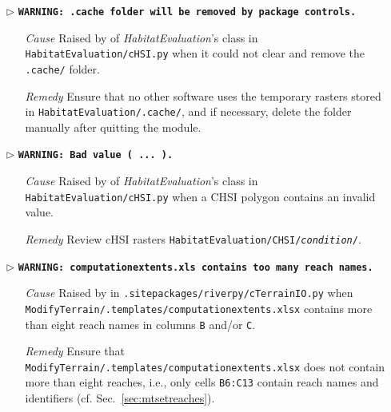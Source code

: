 \begin{itemize}
	\item[$\triangleright$]\textbf{\texttt{WARNING: .cache folder will be removed by package controls.}}
	\begin{itemize}
		\item[\textit{Cause}\hspace{0.27cm}] Raised by  of \textit{HabitatEvaluation}'s  class in \texttt{HabitatEvaluation/cHSI.py} when it could not clear and remove the \texttt{.cache/} folder.
		\item[\textit{Remedy}] Ensure that no other software uses the temporary rasters stored in \texttt{HabitatEvaluation/.cache/}, and if necessary, delete the folder manually after quitting the module.\\
	\end{itemize}

	\item[]
	\item[$\triangleright$]\textbf{\texttt{WARNING: Bad value ( ... ).}}
	\begin{itemize}
		\item[\textit{Cause}\hspace{0.27cm}] Raised by  of \textit{HabitatEvaluation}'s  class in \texttt{HabitatEvaluation/cHSI.py} when a CHSI polygon contains an invalid value.
		\item[\textit{Remedy}] Review cHSI rasters \texttt{HabitatEvaluation/CHSI/\textit{condition}/}.\\
	\end{itemize}

	\item[$\triangleright$]\textbf{\texttt{WARNING: computation{\myUnderscore}extents.xls contains too many reach names.}}
	\begin{itemize}
		\item[\textit{Cause}\hspace{0.27cm}] Raised by  in \texttt{.site{\myUnderscore}packages/riverpy/cTerrainIO.py} when \texttt{ModifyTerrain/.templates/computation{\myUnderscore}extents.xlsx} contains more than eight reach names in columns \texttt{B} and/or \texttt{C}.
		\item[\textit{Remedy}] Ensure that \texttt{ModifyTerrain/.templates/computation{\myUnderscore}extents.xlsx} does not contain more than eight reaches, i.e., only cells \texttt{B6:C13} contain reach names and identifiers (cf. Sec.~\ref{sec:mtsetreaches}).\\
	\end{itemize}	
	

\end{itemize}
